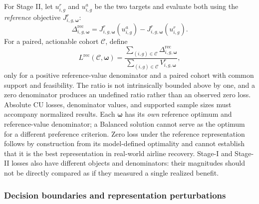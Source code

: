 For Stage II, let $u^r_{i,g}$ and $u^a_{i,g}$ be the two targets and evaluate both using the \emph{reference} objective $J^r_{i,g,\boldsymbol\omega}$:
\[
\Delta_{i,g,\boldsymbol\omega}^{\mathrm{rec}}
=J^r_{i,g,\boldsymbol\omega}(u^a_{i,g})
-J^r_{i,g,\boldsymbol\omega}(u^r_{i,g}).
\]
For a paired, actionable cohort $\mathcal C$, define
\begin{equation}
L^{\mathrm{rec}}(\mathcal C,\boldsymbol\omega)
=\frac{\displaystyle\sum_{(i,g)\in\mathcal C}
\Delta^{\mathrm{rec}}_{i,g,\boldsymbol\omega}}
{\displaystyle\sum_{(i,g)\in\mathcal C}
V^r_{i,g,\boldsymbol\omega}},
\label{eq:normalized_recovery_loss}
\end{equation}
only for a positive reference-value denominator and a paired cohort with common support and feasibility. The ratio is not intrinsically bounded above by one, and a zero denominator produces an undefined ratio rather than an observed zero loss. Absolute CU losses, denominator values, and supported sample sizes must accompany normalized results. Each $\boldsymbol\omega$ has its \emph{own} reference optimum and reference-value denominator; a Balanced solution cannot serve as the optimum for a different preference criterion. Zero loss under the reference representation follows by construction from its model-defined optimality and cannot establish that it is the best representation in real-world airline recovery. Stage-I and Stage-II losses also have different objects and denominators: their magnitudes should not be directly compared as if they measured a single realized benefit.

\subsubsection{Decision boundaries and representation perturbations}


